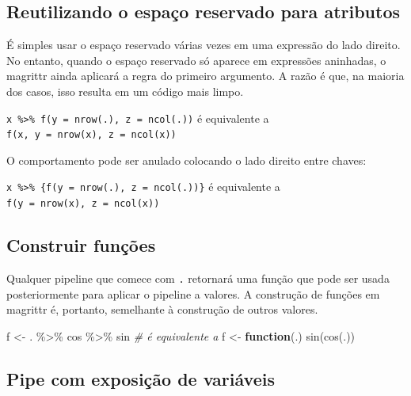 \documentclass[
]{book}
\newenvironment{Shaded}{\begin{snugshade}}{\end{snugshade}}
\newcommand{\CommentTok}[1]{\textcolor[rgb]{0.56,0.35,0.01}{\textit{#1}}}
\newcommand{\ControlFlowTok}[1]{\textcolor[rgb]{0.13,0.29,0.53}{\textbf{#1}}}
\newcommand{\FunctionTok}[1]{\textcolor[rgb]{0.00,0.00,0.00}{#1}}
\newcommand{\NormalTok}[1]{#1}
\newcommand{\OtherTok}[1]{\textcolor[rgb]{0.56,0.35,0.01}{#1}}
\newcommand{\SpecialCharTok}[1]{\textcolor[rgb]{0.00,0.00,0.00}{#1}}
\begin{document}
\hypertarget{reutilizando-o-espauxe7o-reservado-para-atributos}{%
\subsection{Reutilizando o espaço reservado para atributos}\label{reutilizando-o-espauxe7o-reservado-para-atributos}}

É simples usar o espaço reservado várias vezes em uma expressão do lado
direito. No entanto, quando o espaço reservado só aparece em expressões
aninhadas, o magrittr ainda aplicará a regra do primeiro argumento. A razão
é que, na maioria dos casos, isso resulta em um código mais limpo.

\texttt{x\ \%\textgreater{}\%\ f(y\ =\ nrow(.),\ z\ =\ ncol(.))} é equivalente a
\texttt{f(x,\ y\ =\ nrow(x),\ z\ =\ ncol(x))}

O comportamento pode ser anulado colocando o lado direito entre chaves:

\texttt{x\ \%\textgreater{}\%\ \{f(y\ =\ nrow(.),\ z\ =\ ncol(.))\}} é equivalente a
\texttt{f(y\ =\ nrow(x),\ z\ =\ ncol(x))}

\hypertarget{construir-funuxe7uxf5es}{%
\subsection{Construir funções}\label{construir-funuxe7uxf5es}}

Qualquer pipeline que comece com \texttt{.} retornará uma função que pode ser usada posteriormente para aplicar o pipeline a valores. A construção de funções em magrittr é, portanto, semelhante à construção de outros valores.

\begin{Shaded}
\begin{Highlighting}[]
\NormalTok{f }\OtherTok{\textless{}{-}}\NormalTok{ . }\SpecialCharTok{\%\textgreater{}\%}\NormalTok{ cos }\SpecialCharTok{\%\textgreater{}\%}\NormalTok{ sin }
\CommentTok{\# é equivalente a}
\NormalTok{f }\OtherTok{\textless{}{-}} \ControlFlowTok{function}\NormalTok{(.) }\FunctionTok{sin}\NormalTok{(}\FunctionTok{cos}\NormalTok{(.)) }
\end{Highlighting}
\end{Shaded}

\hypertarget{pipe-com-exposiuxe7uxe3o-de-variuxe1veis}{%
\subsection{Pipe com exposição de variáveis}\label{pipe-com-exposiuxe7uxe3o-de-variuxe1veis}}
\end{document}
